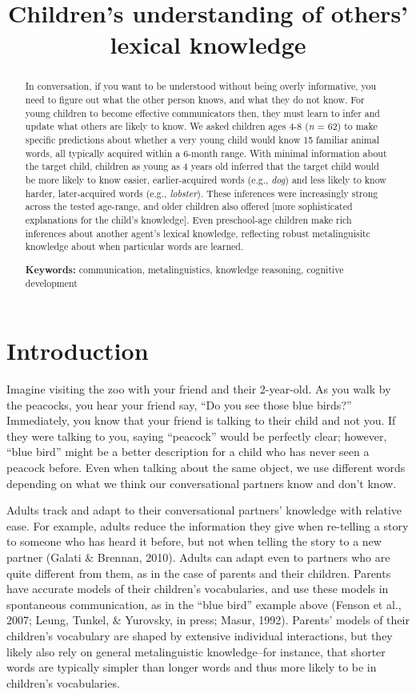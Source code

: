 \documentclass[10pt, letterpaper]{article}
\title{Children's understanding of others' lexical knowledge}
\begin{document}
\maketitle

\begin{abstract}
In conversation, if you want to be understood without being overly
informative, you need to figure out what the other person knows, and
what they do not know. For young children to become effective
communicators then, they must learn to infer and update what others are
likely to know. We asked children ages 4-8 (\emph{n} = 62) to make
specific predictions about whether a very young child would know 15
familiar animal words, all typically acquired within a 6-month range.
With minimal information about the target child, children as young as 4
years old inferred that the target child would be more likely to know
easier, earlier-acquired words (e.g., \emph{dog}) and less likely to
know harder, later-acquired words (e.g., \emph{lobster}). These
inferences were increasingly strong across the tested age-range, and
older children also offered {[}more sophisticated explanations for the
child's knowledge{]}. Even preschool-age children make rich inferences
about another agent's lexical knowledge, reflecting robust
metalinguisitc knowledge about when particular words are learned.

\textbf{Keywords:}
communication, metalinguistics, knowledge reasoning, cognitive
development
\end{abstract}

\hypertarget{introduction}{%
\section{Introduction}\label{introduction}}

Imagine visiting the zoo with your friend and their 2-year-old. As you
walk by the peacocks, you hear your friend say, ``Do you see those blue
birds?'' Immediately, you know that your friend is talking to their
child and not you. If they were talking to you, saying ``peacock'' would
be perfectly clear; however, ``blue bird'' might be a better description
for a child who has never seen a peacock before. Even when talking about
the same object, we use different words depending on what we think our
conversational partners know and don't know.

Adults track and adapt to their conversational partners' knowledge with
relative ease. For example, adults reduce the information they give when
re-telling a story to someone who has heard it before, but not when
telling the story to a new partner (Galati \& Brennan, 2010). Adults can
adapt even to partners who are quite different from them, as in the case
of parents and their children. Parents have accurate models of their
children's vocabularies, and use these models in spontaneous
communication, as in the ``blue bird'' example above (Fenson et al.,
2007; Leung, Tunkel, \& Yurovsky, in press; Masur, 1992). Parents'
models of their children's vocabulary are shaped by extensive individual
interactions, but they likely also rely on general metalinguistic
knowledge--for instance, that shorter words are typically simpler than
longer words and thus more likely to be in children's vocabularies.
\end{document}
